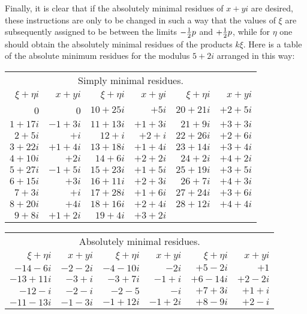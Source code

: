 \documentclass[twoside,12pt]{memoir}
\let\oldfrac\frac
\def\frac#1#2{\mathchoice{\tfrac{#1}{#2}}{\oldfrac{#1}{#2}}{\genfrac{}{}{}{2}{#1}{#2\mathstrut}}{\genfrac{}{}{}{3}{#1}{#2\mathstrut}}}
\begin{document}
Finally, it is clear that if the absolutely minimal residues of \(x+yi\) are desired, these instructions are only to be changed in such a way that the values of \(\xi\) are subsequently assigned to be between the limits \(-\frac{1}{2} p\) and \(+\frac{1}{2} p\), while for \(\eta\) one should obtain the absolutely minimal residues of the products \(k\xi\). Here is a table of the absolute minimum residues for the modulus \(5+2i\) arranged in this way:
\begin{center}
\begin{tabular}{r|r||r|r||r|r}
\multicolumn{6}{c}{Simply minimal residues.}\\
\(\xi+\eta i\) & \(x+yi\) & \(\xi+\eta i\) & \(x+yi\) & \(\xi+\eta i\) & \(x+yi\) \\
\hline
0 & 0 & \(10+25i\) & \(+5i\) & \(20+21i\) & \(+2+5i\) \\
\(1+17i\) & \(-1+3i\) & \(11+13i\) & \(+1+3i\) & \(21+9i\) & \(+3+3i\) \\
\(2+5i\) & \(+i\) & \(12+i\) & \(+2+i\) & \(22+26i\) & \(+2+6i\) \\
\(3+22i\) & \(+1+4i\) & \(13+18i\) & \(+1+4i\) & \(23+14i\) & \(+3+4i\) \\
\(4+10i\) & \(+2i\) & \(14+6i\) & \(+2+2i\) & \(24+2i\) & \(+4+2i\) \\
\(5+27i\) & \(-1+5i\) & \(15+23i\) & \(+1+5i\) & \(25+19i\) & \(+3+5i\) \\
\(6+15i\) & \(+3i\) & \(16+11i\) & \(+2+3i\) & \(26+7i\) & \(+4+3i\) \\
\(7+3i\) & \(+i\) & \(17+28i\) & \(+1+6i\) & \(27+24i\) & \(+3+6i\) \\
\(8+20i\) & \(+4i\) & \(18+16i\) & \(+2+4i\) & \(28+12i\) & \(+4+4i\) \\
\(9+8i\) & \(+1+2i\) & \(19+4i\) & \(+3+2i\) &\multicolumn{2}{c}{} \\
\end{tabular}
\begin{tabular}{r|r||r|r||r|r}
\multicolumn{6}{c}{Absolutely minimal residues.}\\
\(\xi+\eta i\) & \(x+yi\) & \(\xi+\eta i\) & \(x+yi\) & \(\xi+\eta i\) & \(x+yi\) \\
\hline
\(-14-6i\) & \(-2-2i\) & \(-4-10i\) & \(-2i\) & \(+5-2i\) & \(+1\) \\
\(-13+11i\) & \(-3+i\) & \(-3+7i\) & \(-1+i\) & \(+6-14i\) & \(+2-2i\) \\
\(-12-i\) & \(-2-i\) & \(-2-5\) & \(-i\) & \(+7+3i\) & \(+1+i\) \\
\(-11-13i\) & \(-1-3i\) & \(-1+12i\) & \(-1+2i\) & \(+8-9i\) & \(+2-i\) \\

\end{tabular}
\end{center}
\end{document}
